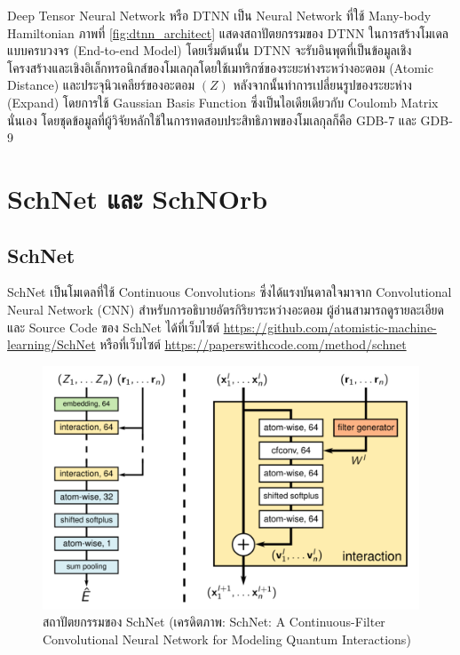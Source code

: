 Deep Tensor Neural Network หรือ DTNN\autocite{schutt2017a} เป็น Neural Network ที่ใช้ Many-body Hamiltonian ภาพที่ \ref{fig:dtnn_architect} แสดงสถาปัตยกรรมของ DTNN ในการสร้างโมเดลแบบครบวงจร (End-to-end Model) โดยเริ่มต้นนั้น DTNN จะรับอินพุตที่เป็นข้อมูลเชิงโครงสร้างและเชิงอิเล็กทรอนิกส์ของโมเลกุลโดยใช้เมทริกซ์ของระยะห่างระหว่างอะตอม (Atomic Distance) และประจุนิวเคลียร์ของอะตอม $(Z)$ หลังจากนั้นทำการเปลี่ยนรูปของระยะห่าง (Expand) โดยการใช้ Gaussian Basis Function ซึ่งเป็นไอเดียเดียวกับ Coulomb Matrix นั่นเอง โดยชุดข้อมูลที่ผู้วิจัยหลักใช้ในการทดสอบประสิทธิภาพของโมเลกุลก็คือ GDB-7 และ GDB-9

\section{SchNet และ SchNOrb}
\label{sec:schnet_schnorb}

\subsection{SchNet}
\label{ssec:schnet}

SchNet เป็นโมเดลที่ใช้ Continuous Convolutions ซึ่งได้แรงบันดาลใจมาจาก Convolutional Neural Network (CNN) สำหรับการอธิบายอัตรกิริยาระหว่างอะตอม\autocite{schutt2017,schutt2018} ผู้อ่านสามารถดูรายละเอียดและ Source Code ของ SchNet ได้ที่เว็บไซต์ \url{https://github.com/atomistic-machine-learning/SchNet} หรือที่เว็บไซต์ \url{https://paperswithcode.com/method/schnet}

\begin{figure}[H]
    \centering
    \includegraphics[width=0.8\linewidth]{fig/schnet.png}
    \caption{สถาปัตยกรรมของ SchNet (เครดิตภาพ: SchNet: A Continuous-Filter Convolutional Neural Network for Modeling Quantum Interactions)}
    \label{fig:schnet_architect}
\end{figure}

